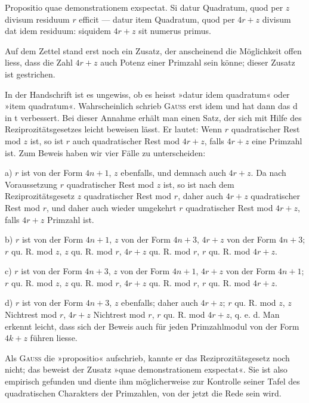 Propositio quae demonstrationem exspectat. Si datur Quadratum, quod
per $z$ divisum residuum $r$ efficit — datur item Quadratum, quod per $4r+z$
divisum dat idem residuum: siquidem $4r+z$ sit numerus primus.

Auf dem Zettel stand erst noch ein Zusatz, der anscheinend die Möglichkeit offen liess, dass die Zahl $4r+z$ auch Potenz einer Primzahl sein könne;
dieser Zusatz ist gestrichen.

In der Handschrift ist es ungewiss, ob es heisst »datur idem quadratum«
oder »item quadratum«. Wahrscheinlich schrieb \textsc{Gauss} erst idem und hat
dann das d in t verbessert. Bei dieser Annahme erhält man einen Satz, der
sich mit Hilfe des Reziprozitätsgesetzes leicht beweisen lässt. Er lautet: Wenn
$r$ quadratischer Rest mod $z$ ist, so ist $r$ auch quadratischer Rest mod $4r+z$, falls
$4r+z$ eine Primzahl ist. Zum Beweis haben wir vier Fälle zu unterscheiden:

a) $r$ ist von der Form $4n+1$, $z$ ebenfalls, und demnach auch $4r+z$.
Da nach Voraussetzung $r$ quadratischer Rest mod $z$ ist, so ist nach dem Reziprozitätsgesetz $z$ quadratischer Rest mod $r$, daher auch $4r+z$ quadratischer
Rest mod $r$, und daher auch wieder umgekehrt $r$ quadratischer Rest mod $4r+z$,
falls $4r+z$ Primzahl ist.

b) $r$ ist von der Form $4n+1$, $z$ von der Form $4n+3$, $4r+z$ von der
Form $4n+3$; $r$ qu. R. mod $z$, $z$ qu. R. mod $r$, $4r+z$ qu. R. mod $r$, $r$ qu. R.
mod $4r+z$.

c) $r$ ist von der Form $4n+3$, $z$ von der Form $4n+1$, $4r+z$ von der
Form $4n+1$; $r$ qu. R. mod $z$, $z$ qu. R. mod $r$, $4r+z$ qu. R. mod $r$, $r$ qu. R.
mod $4r+z$.

d) $r$ ist von der Form $4n+3$, $z$ ebenfalls; daher auch $4r+z$; $r$ qu. R.
mod $z$, $z$ Nichtrest mod $r$, $4r+z$ Nichtrest mod $r$, $r$ qu. R. mod $4r+z$, q. e. d.
Man erkennt leicht, dass sich der Beweis auch für jeden Primzahlmodul von
der Form $4k+z$ führen liesse.

Als \textsc{Gauss} die »propositio« aufschrieb, kannte er das Reziprozitätsgesetz
noch nicht; das beweist der Zusatz »quae demonstrationem exspectat«. Sie ist
also empirisch gefunden und diente ihm möglicherweise zur Kontrolle seiner
Tafel des quadratischen Charakters der Primzahlen, von der jetzt die Rede
sein wird.
\clearpage\endgroup
